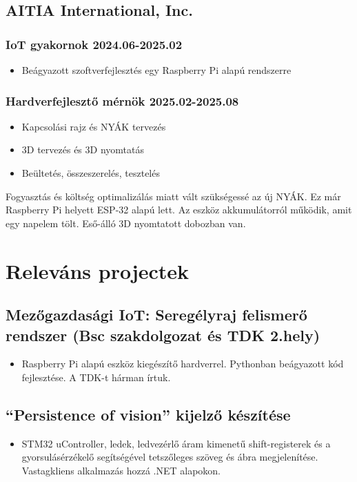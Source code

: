\documentclass{article}
\newcommand{\rside}[1]{\hfill \normalfont\scshape\MakeLowercase{#1}}
\begin{document}
\subsection{AITIA International, Inc.}
\subsubsection{IoT gyakornok \rside{2024.06-2025.02}}
\begin{itemize}
  \item Beágyazott szoftverfejlesztés egy Raspberry Pi alapú rendszerre
\end{itemize}
\subsubsection{Hardverfejlesztő mérnök \rside{2025.02-2025.08}}
\begin{itemize}
  \item Kapcsolási rajz és NYÁK tervezés
  \item 3D tervezés és 3D nyomtatás 
  \item Beültetés, összeszerelés, tesztelés
\end{itemize}
Fogyasztás és költség optimalizálás miatt vált szükségessé az új NYÁK. Ez már Raspberry Pi helyett ESP-32 alapú lett. Az eszköz akkumulátorról működik, amit egy napelem tölt. Eső-álló 3D nyomtatott dobozban van.
\section{\faFlask\enspace Releváns projectek}

\subsection{Mezőgazdasági IoT: Seregélyraj felismerő rendszer (Bsc szakdolgozat és TDK 2.hely)}
\begin{itemize}
  \item Raspberry Pi alapú eszköz kiegészítő hardverrel. Pythonban beágyazott kód fejlesztése. A TDK-t hárman írtuk.
\end{itemize}

\subsection{\enquote{Persistence of vision} kijelző készítése}
\begin{itemize}
  \item STM32 uController, ledek, ledvezérlő áram kimenetű shift-registerek és a
gyorsulásérzékelő segítségével tetszőleges szöveg és ábra megjelenítése. Vastagkliens alkalmazás hozzá .NET alapokon.
\end{itemize}
\end{document}
